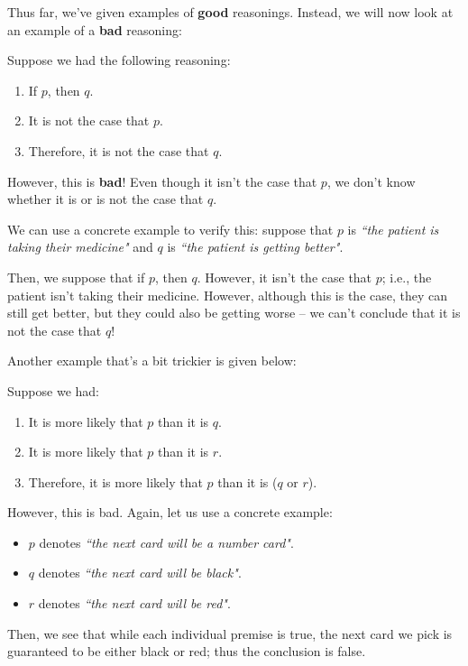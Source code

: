 \documentclass[openany]{book}
\begin{document}
Thus far, we've given examples of \textbf{good} reasonings. Instead, we will now look at an example of a \textbf{bad} reasoning:
\begin{example}
	Suppose we had the following reasoning:
	\begin{enumerate}
		\item If $p$, then $q$.
		\item It is not the case that $p$.
		\item Therefore, it is not the case that $q$.
	\end{enumerate}

	However, this is \textbf{bad}! Even though it isn't the case that $p$, we don't know whether it is or is not the case that $q$.
	
	We can use a concrete example to verify this: suppose that $p$ is \textit{``the patient is taking their medicine"} and $q$ is \textit{``the patient is getting better"}.
	
	Then, we suppose that if $p$, then $q$. However, it isn't the case that $p$; i.e., the patient isn't taking their medicine. However, although this is the case, they can still get better, but they could also be getting worse -- we can't conclude that it is not the case that $q$!
\end{example}

Another example that's a bit trickier is given below:
\begin{example}
	Suppose we had:
	\begin{enumerate}
		\item It is more likely that $p$ than it is $q$.
		\item It is more likely that $p$ than it is $r$.
		\item Therefore, it is more likely that $p$ than it is ($q$ or $r$).
	\end{enumerate}

	However, this is bad. Again, let us use a concrete example:
	\begin{itemize}
		\item $p$ denotes \textit{``the next card will be a number card"}.
		\item $q$ denotes \textit{``the next card will be black"}.
		\item $r$ denotes \textit{``the next card will be red"}.
	\end{itemize}

	Then, we see that while each individual premise is true, the next card we pick is guaranteed to be either black or red; thus the conclusion is false.
\end{example}
\end{document}
